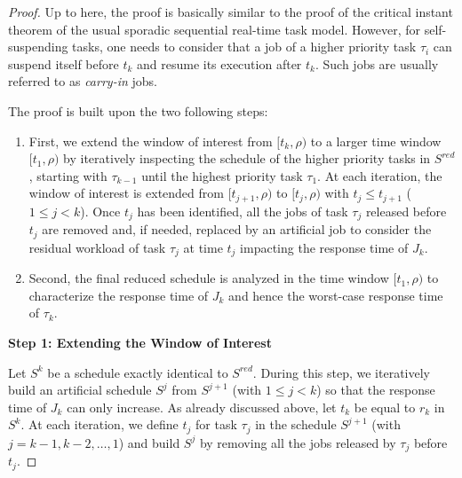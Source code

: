 \begin{proof}
Up to here, the proof is basically similar to the proof of the critical instant theorem of the usual sporadic sequential real-time task model. However, for self-suspending tasks, one needs to consider that a job of a higher priority task $\tau_i$ can suspend itself before $t_k$ and resume its execution after $t_k$. Such jobs are usually referred to as \emph{carry-in} jobs. %

The proof is built upon the two following steps:
\begin{enumerate}
\item First, we extend the window of interest from $[t_k, \rho)$ to a larger time window $[t_1, \rho)$ by iteratively inspecting the schedule of the higher priority tasks in $S^{red}$, starting with $\tau_{k-1}$ until the highest priority task $\tau_1$. At each iteration, the window of interest is extended from $[t_{j+1}, \rho)$ to $[t_{j}, \rho)$ with $t_j \leq t_{j+1}$ ($1 \leq j < k$). Once $t_j$ has been identified, all the jobs of task $\tau_j$ released before $t_j$ are removed and, if needed, replaced by an artificial job to consider the residual workload of task $\tau_j$ at time $t_j$ impacting the response time of $J_{k}$. 
\item Second, the final reduced schedule is analyzed in the time window $[t_1, \rho)$ to characterize the response time of $J_{k}$ and hence the worst-case response time of $\tau_k$.
\end{enumerate}

{\bf Step 1: Extending the Window of Interest} 

Let $S^k$ be a schedule exactly identical to $S^{red}$. During this step, we iteratively build an artificial schedule $S^j$ from $S^{j+1}$ (with $1 \leq j < k$) so that the response time of $J_{k}$ can only increase. As already discussed above, let $t_k$ be equal to $r_k$ in $S^k$. At each iteration, we define $t_j$ for task $\tau_j$ in the schedule $S^{j+1}$ (with $j=k-1, k-2, \ldots, 1$) and build $S^j$ by removing all the jobs released by $\tau_j$ before $t_j$.



\end{proof}
